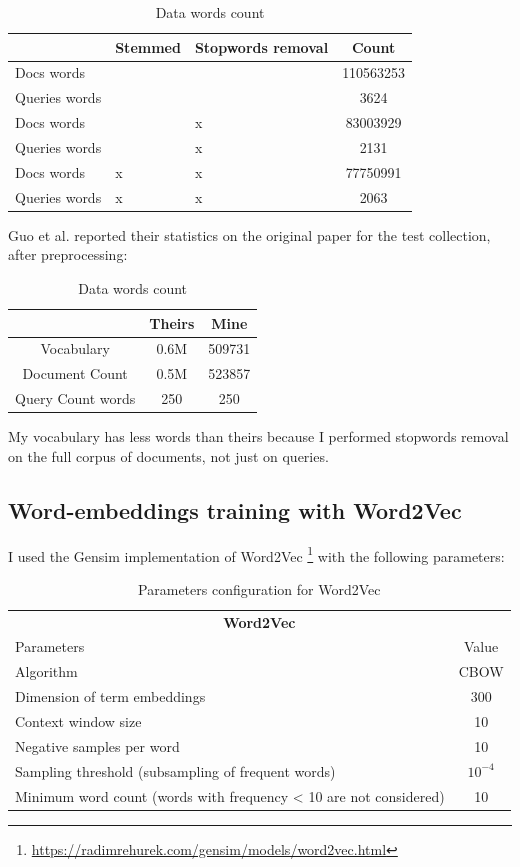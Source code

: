 \begin{table}[H]
\centering
\begin{tabular}{p{2cm}p{2cm}p{2cm}c}
 & Stemmed & Stopwords removal & Count \\ \hline
Docs words & & & 110563253 \\ \hline
Queries words & & & 3624 \\ \hline
Docs words & & x & 83003929 \\ \hline
Queries words & & x & 2131 \\ \hline
Docs words & x & x & 77750991 \\ \hline
Queries words & x & x & 2063 \\ \hline
\end{tabular}
\caption{Data words count}
\end{table}

Guo et al. reported their statistics on the original paper for the test collection, after preprocessing:

\begin{table}[H]
\centering
\begin{tabular}{ccc}
 & Theirs & Mine \\ \hline
Vocabulary & 0.6M & 509731 \\
Document Count & 0.5M & 523857 \\
Query Count words & 250 & 250 \\ \hline
\end{tabular}
\caption{Data words count}
\end{table}

My vocabulary has less words than theirs because I performed stopwords removal on the full corpus of documents, not just on queries.

\subsection{Word-embeddings training with Word2Vec}
\label{ssec:wemb}

I used the Gensim implementation of Word2Vec \footnote{\url{https://radimrehurek.com/gensim/models/word2vec.html}} with the following parameters:

\begin{table}[H]
\centering
\begin{tabular}{p{8cm}|c}
\multicolumn{2}{c}{\textbf{Word2Vec}} \\
Parameters & Value \\ \hline
Algorithm & CBOW \\
Dimension of term embeddings & 300 \\
Context window size & 10 \\
Negative samples per word & 10 \\
Sampling threshold (subsampling of frequent words) & $10^{-4}$ \\
Minimum word count (words with frequency < 10 are not considered) & 10 \\ \hline
\end{tabular}
\caption{Parameters configuration for Word2Vec}
\label{table:w2v_config}
\end{table}

